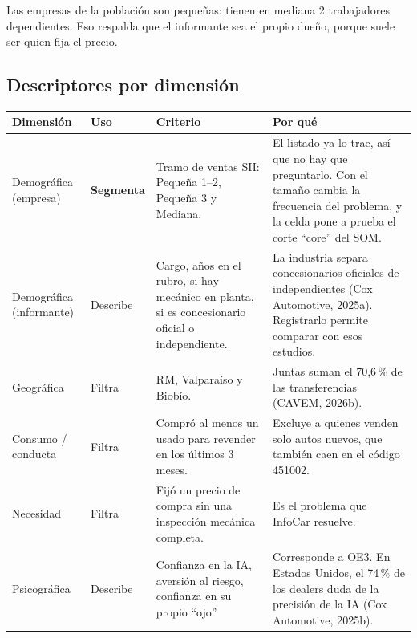 \documentclass[11pt,a4paper]{article}
\begin{document}
Las empresas de la población son pequeñas: tienen en mediana 2 trabajadores dependientes. Eso respalda que el informante sea el propio dueño, porque suele ser quien fija el precio.

\subsection{Descriptores por dimensión}
\begin{center}\small
\begin{tabularx}{\textwidth}{@{}p{2.3cm}p{1.6cm}LL@{}}
\toprule
\textbf{Dimensión} & \textbf{Uso} & \textbf{Criterio} & \textbf{Por qué}\\
\midrule
Demográfica (empresa) & \textbf{Segmenta} & Tramo de ventas SII: Pequeña 1–2, Pequeña 3 y Mediana. & El listado ya lo trae, así que no hay que preguntarlo. Con el tamaño cambia la frecuencia del problema, y la celda pone a prueba el corte \enquote{core} del SOM. \\
Demográfica (informante) & Describe & Cargo, años en el rubro, si hay mecánico en planta, si es concesionario oficial o independiente. & La industria separa concesionarios oficiales de independientes (Cox Automotive, 2025a). Registrarlo permite comparar con esos estudios. \\
Geográfica & Filtra & RM, Valparaíso y Biobío. & Juntas suman el 70,6\,\% de las transferencias (CAVEM, 2026b). \\
Consumo / conducta & Filtra & Compró al menos un usado para revender en los últimos 3 meses. & Excluye a quienes venden solo autos nuevos, que también caen en el código 451002. \\
Necesidad & Filtra & Fijó un precio de compra sin una inspección mecánica completa. & Es el problema que InfoCar resuelve. \\
Psicográfica & Describe & Confianza en la IA, aversión al riesgo, confianza en su propio \enquote{ojo}. & Corresponde a OE3. En Estados Unidos, el 74\,\% de los dealers duda de la precisión de la IA (Cox Automotive, 2025b). \\
\bottomrule
\end{tabularx}
\end{center}
\end{document}
